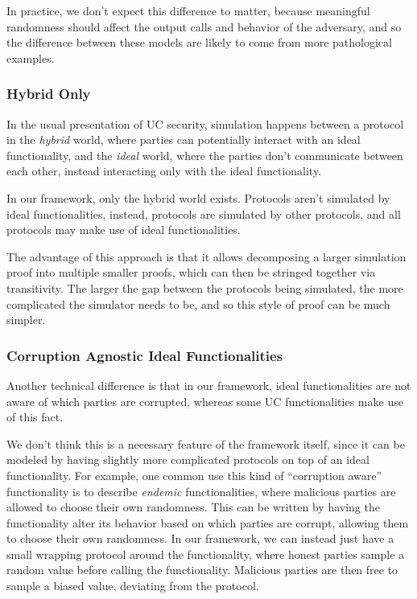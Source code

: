 In practice, we don't expect this difference to matter,
because meaningful randomness should affect the output
calls and behavior of the adversary,
and so the difference between these models are likely
to come from more pathological examples.

\subsubsection*{Hybrid Only}

In the usual presentation of UC security, simulation
happens between a protocol in the \emph{hybrid} world,
where parties can potentially interact with an ideal functionality,
and the \emph{ideal} world, where the parties
don't communicate between each other, instead interacting
only with the ideal functionality.

In our framework, only the hybrid world exists.
Protocols aren't simulated by ideal functionalities,
instead, protocols are simulated by other protocols,
and all protocols may make use of ideal functionalities.

The advantage of this approach is that it allows decomposing
a larger simulation proof into multiple smaller proofs,
which can then be stringed together via transitivity.
The larger the gap between the protocols being simulated,
the more complicated the simulator needs to be,
and so this style of proof can be much simpler.

\subsubsection*{Corruption Agnostic Ideal Functionalities}

Another technical difference is that in our framework,
ideal functionalities are not aware of which parties are corrupted,
whereas some UC functionalities make use of this fact.

We don't think this is a necessary feature of the framework itself,
since it can be modeled by having slightly more complicated
protocols on top of an ideal functionality.
For example, one common use this kind of ``corruption aware''
functionality is to describe \emph{endemic} functionalities,
where malicious parties are allowed to choose their own randomness.
This can be written by having the functionality alter its behavior
based on which parties are corrupt, allowing them to choose their
own randomness.
In our framework, we can instead just have a small wrapping
protocol around the functionality, where honest parties
sample a random value before calling the functionality.
Malicious parties are then free to sample a biased value,
deviating from the protocol.


